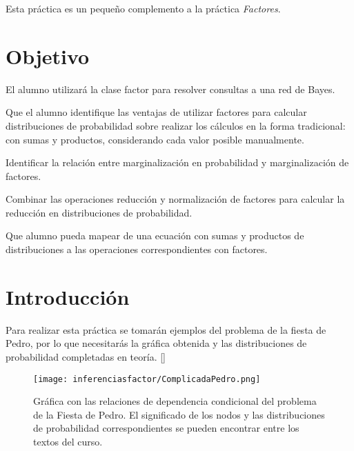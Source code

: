 
Esta práctica es un pequeño complemento a la práctica \emph{Factores}.

\section{Objetivo}

El alumno utilizará la clase factor para resolver consultas a una red de Bayes.

\begin{compactitem}
 \item Que el alumno identifique las ventajas de utilizar factores para calcular distribuciones de probabilidad sobre realizar los cálculos en la forma tradicional: con sumas y productos, considerando cada valor posible manualmente.
 
 \item Identificar la relación entre marginalización en probabilidad y marginalización de factores.
 
 \item Combinar las operaciones reducción y normalización de factores para calcular la reducción en distribuciones de probabilidad.
 
 \item Que alumno pueda mapear de una ecuación con sumas y productos de distribuciones a las operaciones correspondientes con factores.
\end{compactitem}


\section{Introducción}

Para realizar esta práctica se tomarán ejemplos del problema de la fiesta de Pedro, por lo que necesitarás la gráfica obtenida y las distribuciones de probabilidad completadas en teoría. []

\begin{figure}
 \centering
 \texttt{[image: inferenciasfactor/ComplicadaPedro.png]}
 \caption{Gráfica con las relaciones de dependencia condicional del problema de la Fiesta de Pedro.  El significado de los nodos y las distribuciones de probabilidad correspondientes se pueden encontrar entre los textos del curso.}\label{Fig:GrafPedro}
\end{figure}


